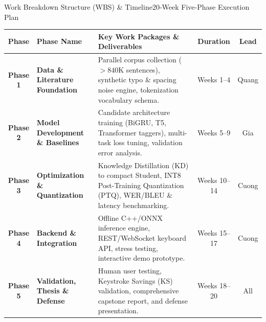\documentclass[aspectratio=169,10pt]{beamer}
\begin{document}
\begin{frame}{Work Breakdown Structure (WBS) \& Timeline}{20-Week Five-Phase Execution Plan}
  \begin{table}[H]
    \centering
    \scriptsize
    \renewcommand{\arraystretch}{1.2}
    \begin{tabularx}{\textwidth}{c p{3.0cm} X c c}
      \toprule
      \textbf{Phase} & \textbf{Phase Name} & \textbf{Key Work Packages \& Deliverables} & \textbf{Duration} & \textbf{Lead} \\
      \midrule
      \textbf{Phase 1} & \textbf{Data \& Literature Foundation} & Parallel corpus collection ($>840\text{K}$ sentences), synthetic typo \& spacing noise engine, tokenization vocabulary schema. & Weeks 1--4 & Quang \\
      \addlinespace
      \textbf{Phase 2} & \textbf{Model Development \& Baselines} & Candidate architecture training (BiGRU, T5, Transformer taggers), multi-task loss tuning, validation error analysis. & Weeks 5--9 & Gia \\
      \addlinespace
      \textbf{Phase 3} & \textbf{Optimization \& Quantization} & Knowledge Distillation (KD) to compact Student, INT8 Post-Training Quantization (PTQ), WER/BLEU \& latency benchmarking. & Weeks 10--14 & Cuong \\
      \addlinespace
      \textbf{Phase 4} & \textbf{Backend \& Integration} & Offline C++/ONNX inference engine, REST/WebSocket keyboard API, stress testing, interactive demo prototype. & Weeks 15--17 & Cuong \\
      \addlinespace
      \textbf{Phase 5} & \textbf{Validation, Thesis \& Defense} & Human user testing, Keystroke Savings (KS) validation, comprehensive capstone report, and defense presentation. & Weeks 18--20 & All \\
      \bottomrule
    \end{tabularx}
  \end{table}
\end{frame}
\end{document}
